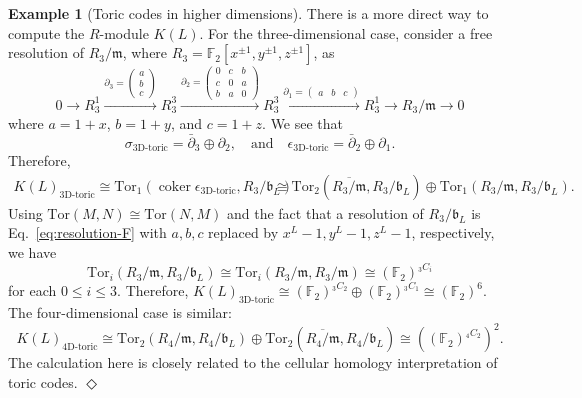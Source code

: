 \documentclass[letterpaper,12pt]{amsart}
\theoremstyle{definition} \newtheorem{defn}{Definition}
\theoremstyle{definition} \newtheorem{rem}{Remark}
\theoremstyle{definition} \newtheorem{example}{Example}
\newcommand{\coker}{\mathop{\mathrm{coker}}}
\newcommand{\Tor}{{\mathrm{Tor}}}
\newcommand{\FF}{\mathbb{F}}
\newcommand{\mm}{\mathfrak{m}}
\newcommand{\bb}{\mathfrak{b}}
\begin{document}
\begin{example}[Toric codes in higher dimensions]
There is a more direct way to compute the $R$-module $K(L)$.
For the three-dimensional case, consider a free resolution of $R_3/\mm$,
where $R_3 = \FF_2[x^{\pm 1},y^{\pm 1},z^{\pm 1}]$,
as
\[
 0 \to 
R_3^1 
\xrightarrow{
\partial_3 = 
\begin{pmatrix} a \\ b \\ c \end{pmatrix}
}
R_3^3
\xrightarrow{  
\partial_2 =
\begin{pmatrix}
 0 & c & b  \\
 c & 0 & a  \\
 b & a & 0   
\end{pmatrix}
}
R_3^3
\xrightarrow{
\partial_1 =
\begin{pmatrix}
a & b  & c
\end{pmatrix}
}
R_3^1
\to
R_3/\mm
\to 0
\]
where $a=1+x$, $b=1+y$, and $c=1+z$.
We see that
\begin{equation}
 \sigma_\text{3D-toric} = \bar \partial_3 \oplus \partial_2 ,
 \quad \text{and} \quad
 \epsilon_\text{3D-toric} = \bar \partial_2 \oplus \partial_1  .
\label{eq:resolution-F}
\end{equation}
Therefore,
\begin{align*}
 K(L)_\text{3D-toric} \cong \Tor_1(\coker \epsilon_\text{3D-toric},R_3/\bb_L) 
&\cong \Tor_2( \overline{ R_3/\mm}, R_3/\bb_L ) \oplus \Tor_1( R_3/\mm, R_3/\bb_L ).
\end{align*}
Using $\Tor(M,N) \cong \Tor(N,M)$ and the fact that a resolution of $R_3/\bb_L$ is Eq.~\eqref{eq:resolution-F}
with $a,b,c$ replaced by $x^L-1,y^L-1,z^L-1$, respectively,
we have 
\[
 \Tor_i(R_3/\mm,R_3/\bb_L) \cong \Tor_i(R_3/\mm,R_3/\mm) \cong (\FF_2)^{_3 C _i}
\]
for each $0 \le i \le 3$.
Therefore, $K(L)_\text{3D-toric} \cong (\FF_2)^{_3 C _2} \oplus (\FF_2)^{_3 C _1} \cong (\FF_2)^6$.
The four-dimensional case is similar:
\[
 K(L)_\text{4D-toric} \cong \Tor_2 (R_4/\mm, R_4/\bb_L) \oplus \Tor_2 (\overline{R_4/\mm}, R_4/\bb_L) \cong \left( (\FF_2)^{_4 C _2} \right)^2 .
\]
The calculation here is closely related
to the cellular homology interpretation of toric codes.
\hfill $\Diamond$
\end{example} %
\end{document}
